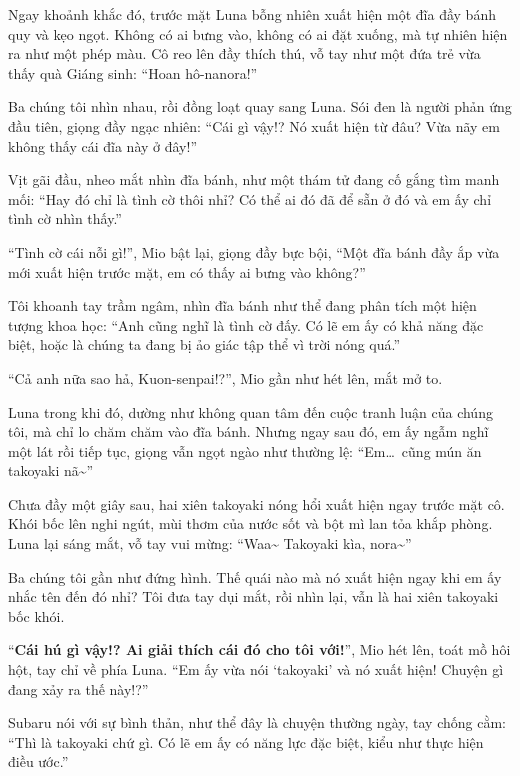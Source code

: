 \documentclass[../main.tex]{subfiles}
\begin{document}
Ngay khoảnh khắc đó, trước mặt Luna bỗng nhiên xuất hiện một đĩa đầy bánh quy và kẹo ngọt. Không có ai bưng vào, không có ai đặt xuống, mà tự nhiên hiện ra như một phép màu. Cô reo lên đầy thích thú, vỗ tay như một đứa trẻ vừa thấy quà Giáng sinh: ``Hoan hô-nanora!''


Ba chúng tôi nhìn nhau, rồi đồng loạt quay sang Luna. Sói đen là người phản ứng đầu tiên, giọng đầy ngạc nhiên: ``Cái gì vậy!? Nó xuất hiện từ đâu? Vừa nãy em không thấy cái đĩa này ở đây!''

Vịt gãi đầu, nheo mắt nhìn đĩa bánh, như một thám tử đang cố gắng tìm manh mối: ``Hay đó chỉ là tình cờ thôi nhỉ? Có thể ai đó đã để sẵn ở đó và em ấy chỉ tình cờ nhìn thấy.''

``Tình cờ cái nỗi gì!'', Mio bật lại, giọng đầy bực bội, ``Một đĩa bánh đầy ắp vừa mới xuất hiện trước mặt, em có thấy ai bưng vào không?''

Tôi khoanh tay trầm ngâm, nhìn đĩa bánh như thể đang phân tích một hiện tượng khoa học: ``Anh cũng nghĩ là tình cờ đấy. Có lẽ em ấy có khả năng đặc biệt, hoặc là chúng ta đang bị ảo giác tập thể vì trời nóng quá.''

``Cả anh nữa sao hả, Kuon-senpai!?'', Mio gần như hét lên, mắt mở to.

Luna trong khi đó, dường như không quan tâm đến cuộc tranh luận của chúng tôi, mà chỉ lo chăm chăm vào đĩa bánh. Nhưng ngay sau đó, em ấy ngẫm nghĩ một lát rồi tiếp tục, giọng vẫn ngọt ngào như thường lệ: ``Em\dots\ cũng mún ăn takoyaki nã\~{}''

Chưa đầy một giây sau, hai xiên takoyaki nóng hổi xuất hiện ngay trước mặt cô. Khói bốc lên nghi ngút, mùi thơm của nước sốt và bột mì lan tỏa khắp phòng. Luna lại sáng mắt, vỗ tay vui mừng: ``Waa\~{} Takoyaki kìa, nora\~{}''


Ba chúng tôi gần như đứng hình. Thế quái nào mà nó xuất hiện ngay khi em ấy nhắc tên đến đó nhỉ? Tôi đưa tay dụi mắt, rồi nhìn lại, vẫn là hai xiên takoyaki bốc khói.

``\textbf{Cái hú gì vậy!? Ai giải thích cái đó cho tôi với!}'', Mio hét lên, toát mồ hôi hột, tay chỉ về phía Luna. ``Em ấy vừa nói `takoyaki' và nó xuất hiện! Chuyện gì đang xảy ra thế này!?''

Subaru nói với sự bình thản, như thể đây là chuyện thường ngày, tay chống cằm: ``Thì là takoyaki chứ gì. Có lẽ em ấy có năng lực đặc biệt, kiểu như thực hiện điều ước.''
\end{document}
